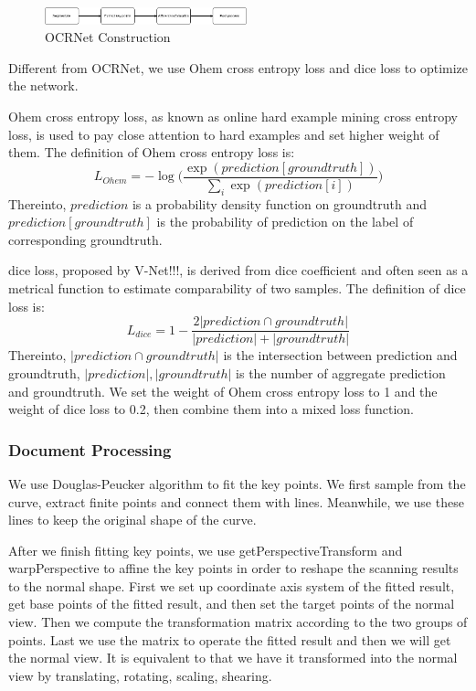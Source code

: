 \documentclass[10pt, conference, compsocconf]{IEEEtran}
\begin{document}

			\begin{figure}[!h]
				\centering
				\includegraphics[width=2.3in]{./Assets/FlowChart.png}
				\caption{OCRNet Construction}
			\end{figure}


			Different from OCRNet, we use Ohem cross entropy loss and dice loss to optimize the network. 

			Ohem cross entropy loss, as known as online hard example mining cross entropy loss, is used to pay close attention to hard examples and set higher weight of them. 
			The definition of Ohem cross entropy loss is:
			$$
			L_{Ohem} = -\log\bigg( \frac{\exp(prediction[groundtruth])}{\sum_i \exp(prediction[i])} \bigg)
			$$
			Thereinto, $prediction$ is a probability density function on groundtruth and $prediction[groundtruth]$ is the probability of prediction on the label of corresponding groundtruth. 

			dice loss, proposed by V-Net!!!, is derived from dice coefficient and often seen as a metrical function to estimate comparability of two samples. 
			The definition of dice loss is: 
			$$
			L_{dice} = 1 - \frac{2|prediction\cap groundtruth|}{|prediction| + |groundtruth|}
			$$
			Thereinto, $|prediction\cap groundtruth|$ is the intersection between prediction and groundtruth, $|prediction|, |groundtruth|$ is the number of aggregate prediction and groundtruth. 
			We set the weight of Ohem cross entropy loss to 1 and the weight of dice loss to 0.2, then combine them into a mixed loss function.  

			\subsubsection{Document Processing}

			We use Douglas-Peucker algorithm to fit the key points. 
			We first sample from the curve, extract finite points and connect them with lines. 
			Meanwhile, we use these lines to keep the original shape of the curve. 
			
			

			After we finish fitting key points, we use getPerspectiveTransform and warpPerspective to affine the key points in order to reshape the scanning results to the normal shape.
			First we set up coordinate axis system of the fitted result, get base points of the fitted result, and then set the target points of the normal view. 
			Then we compute the transformation matrix according to the two groups of points. 
			Last we use the matrix to operate the fitted result and then we will get the normal view. 
			It is equivalent to that we have it transformed into the normal view by translating, rotating, scaling, shearing.
\end{document}
